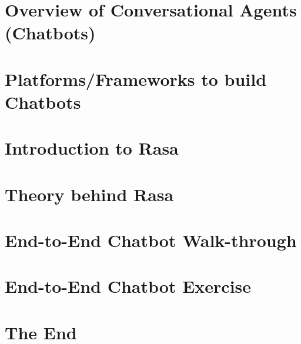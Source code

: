 \section[Overview]{Overview of Conversational Agents (Chatbots)}


\section[Platforms]{Platforms/Frameworks to build Chatbots}



\section[Intro]{Introduction to Rasa}



\section[Theory]{Theory behind Rasa}



\section[Zomato]{End-to-End Chatbot Walk-through}

\section[IPL]{End-to-End Chatbot Exercise}

% 
% 

% 
% 


\section[End]{The End}

